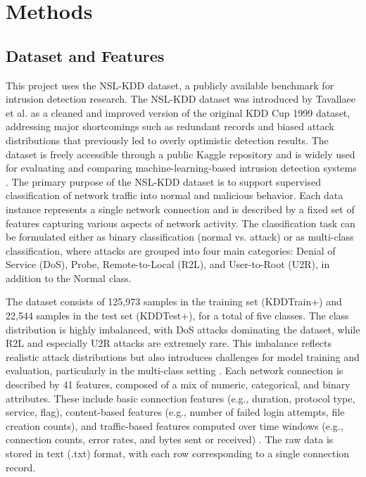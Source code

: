 \chapter{Methods}
\label{cha:1}

\section{Dataset and Features}
This project uses the NSL-KDD dataset, a publicly available benchmark for intrusion detection research. The NSL-KDD dataset was introduced by Tavallaee et al. \cite{tavallaee2009detailed} as a cleaned and improved version of the original KDD Cup 1999 dataset, addressing major shortcomings such as redundant records and biased attack distributions that previously led to overly optimistic detection results. The dataset is freely accessible through a public Kaggle repository \cite{kaggleNSLKDD} and is widely used for evaluating and comparing machine-learning-based intrusion detection systems \cite{abrar2020machine}. The primary purpose of the NSL-KDD dataset is to support supervised classification of network traffic into normal and malicious behavior. 
Each data instance represents a single network connection and is described by a fixed set of features capturing various aspects of network activity. 
The classification task can be formulated either as binary classification (normal vs. attack) or as multi-class classification, where attacks are grouped into four main categories: 
Denial of Service (DoS), Probe, Remote-to-Local (R2L), and User-to-Root (U2R), in addition to the Normal class.

The dataset consists of 125,973 samples in the training set (KDDTrain+) and 22,544 samples in the test set (KDDTest+), for a total of five classes. 
The class distribution is highly imbalanced, with DoS attacks dominating the dataset, while R2L and especially U2R attacks are extremely rare. 
This imbalance reflects realistic attack distributions but also introduces challenges for model training and evaluation, particularly in the multi-class setting \cite{hong2021machine}.
 Each network connection is described by 41 features, composed of a mix of numeric, categorical, and binary attributes. 
 These include basic connection features (e.g., duration, protocol type, service, flag), content-based features (e.g., number of failed login attempts, file creation counts), 
 and traffic-based features computed over time windows (e.g., connection counts, error rates, and bytes sent or received) \cite{tavallaee2009detailed}. 
 The raw data is stored in text (.txt) format, with each row corresponding to a single connection record.

